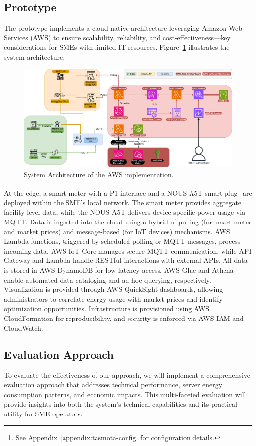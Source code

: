 \subsection{Prototype}
\label{methodology:prototype}
The prototype implements a cloud-native architecture leveraging Amazon Web Services (AWS) to ensure scalability, reliability, and cost-effectiveness—key considerations for SMEs with limited IT resources. Figure~\ref{fig:architecture} illustrates the system architecture.
\begin{figure}[htbp]
\centering
\includegraphics[width=1.1\textwidth]{fig/architektur_new_2.png}
\caption{System Architecture of the AWS implementation.}
\label{fig:architecture}
\end{figure}
At the edge, a smart meter with a P1 interface and a NOUS A5T smart plug\footnote{See Appendix~\ref{appendix:tasmota-config} for configuration details.} are deployed within the SME’s local network. The smart meter provides aggregate facility-level data, while the NOUS A5T delivers device-specific power usage via MQTT. Data is ingested into the cloud using a hybrid of polling (for smart meter and market prices) and message-based (for IoT devices) mechanisms.
AWS Lambda functions, triggered by scheduled polling or MQTT messages, process incoming data. AWS IoT Core manages secure MQTT communication, while API Gateway and Lambda handle RESTful interactions with external APIs. All data is stored in AWS DynamoDB for low-latency access. AWS Glue and Athena enable automated data cataloging and ad hoc querying, respectively. Visualization is provided through AWS QuickSight dashboards, allowing administrators to correlate energy usage with market prices and identify optimization opportunities. Infrastructure is provisioned using AWS CloudFormation for reproducibility, and security is enforced via AWS IAM and CloudWatch.
\subsection{Evaluation Approach}
\label{methodology:evaluation-approach}
To evaluate the effectiveness of our approach, we will implement a comprehensive
evaluation approach that addresses technical performance, server energy
consumption patterns, and economic impacts. This multi-faceted evaluation will
provide insights into both the system's technical capabilities and its practical
utility for SME operators.

